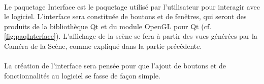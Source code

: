\paragraph{}
Le paquetage Interface est le paquetage utilisé par l’utilisateur pour interagir avec le logiciel. L’interface sera constituée de boutons et de fenêtres, qui seront des produits de la bibliothèque Qt et du module OpenGL pour Qt (cf. \ref{fig:paqInterface}). L’affichage de la scène se fera à partir des vues générées par la Caméra de la Scène, comme expliqué dans la partie précédente.

\paragraph{}
La création de l’interface sera pensée pour que l’ajout de boutons et de fonctionnalités au logiciel se fasse de façon simple.

\newpage
